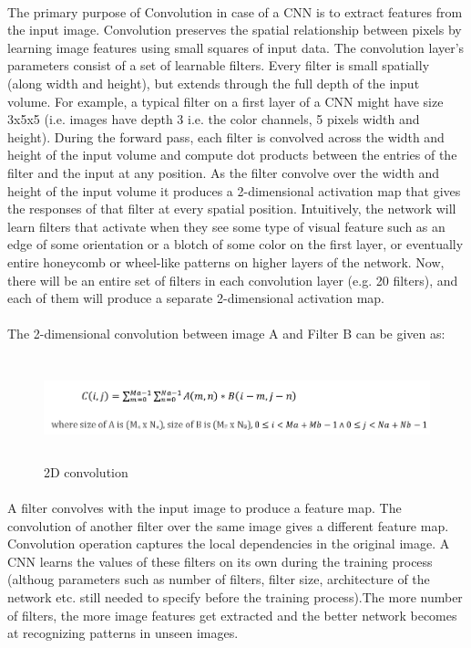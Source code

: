 \documentclass[a4paper,12pt,oneside]{article}
\begin{document}
\paragraph{}
﻿The primary purpose of Convolution in case of a CNN is to extract features from the input
image. Convolution preserves the spatial relationship between pixels by learning image
features using small squares of input data. The convolution layer’s parameters consist of a set
of learnable filters. Every filter is small spatially (along width and height), but extends through
the full depth of the input volume. For example, a typical filter on a first layer of a CNN might
have size 3x5x5 (i.e. images have depth 3 i.e. the color channels, 5 pixels width and height).
During the forward pass, each filter is convolved across the width and height of the input
volume and compute dot products between the entries of the filter and the input at any position.
As the filter convolve over the width and height of the input volume it produces a 2-dimensional
activation map that gives the responses of that filter at every spatial position. Intuitively, the
network will learn filters that activate when they see some type of visual feature such as an ﻿edge of some orientation or a blotch of some color on the first layer, or eventually entire
honeycomb or wheel-like patterns on higher layers of the network. Now, there will be an entire
set of filters in each convolution layer (e.g. 20 filters), and each of them will produce a separate
2-dimensional activation map.
\paragraph{}
﻿The 2-dimensional convolution between image A and Filter B can be given as:

\begin{figure}[H]
\centering
\includegraphics[height=3cm,width=17cm]{1a.png}
\caption{2D convolution}
\end{figure}

\paragraph{}
﻿A filter convolves with the input image to produce a feature map. The convolution of another
filter over the same image gives a different feature map. Convolution operation captures the
local dependencies in the original image. A CNN learns the values of these filters on its own
during   the   training   process (althoug parameters such as number of filters, filter
size, architecture of the network etc. still needed to specify before the training process).The
more number of filters, the more image features get extracted and the better network becomes
at recognizing patterns in unseen images.
\end{document}
